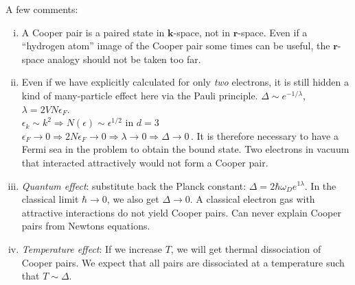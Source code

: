 A few comments:
\begin{enumerate}[(i)]
  \item A Cooper pair is a paired state in $\bm k$-space, not in $\bm r$-space.
        Even if a ``hydrogen atom'' image of the Cooper pair some times can be useful, the $\bm r$-space analogy should not be taken too far.
  \item Even if we have explicitly calculated for only \emph{two} electrons, it is still hidden a kind of many-particle effect here via the Pauli principle.
        $\Delta \sim e^{-1/\lambda}$, $\lambda = 2VN\epsilon_F$. \\
        $\epsilon_k \sim k^2 \Rightarrow N(\epsilon) \sim \epsilon^{1/2}$ in $d=3$\\
        $\epsilon_F \rightarrow 0 \Rightarrow 2N\epsilon_F \rightarrow 0 \Rightarrow \lambda \rightarrow 0 \Rightarrow \Delta \rightarrow 0$\,.
        It is therefore necessary to have a Fermi sea in the problem to obtain the bound state.
        Two electrons in vacuum that interacted attractively would not form a Cooper pair.
  \item \emph{Quantum effect}: substitute back the Planck constant: $\Delta = 2\hbar \omega_D e^{1\lambda}$. 
        In the classical limit $\hbar \rightarrow 0$, we also get $\Delta \rightarrow 0$.
        A classical electron gas with attractive interactions do not yield Cooper pairs.
        Can never explain Cooper pairs from Newtons equations.
  \item \emph{Temperature effect}: If we increase $T$, we will get thermal dissociation of Cooper pairs.
        We expect that all pairs are dissociated at a temperature such that $T \sim \Delta$.
\end{enumerate}





\clearpage
